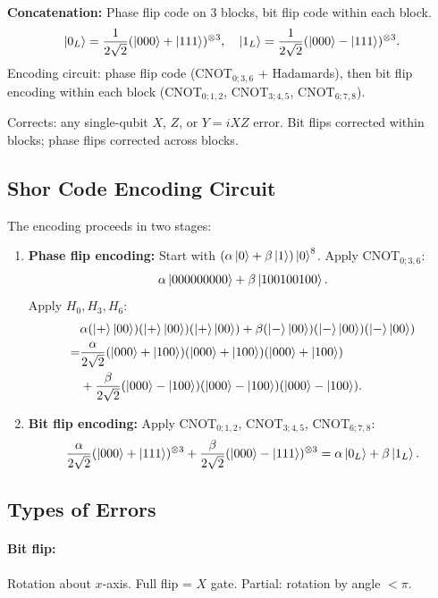 \documentclass[10pt,a4paper]{article}
\begin{document}
\begin{tcolorbox}[algostyle, title={Algorithm: Shor 9-Qubit Code}]
\textbf{Concatenation:} Phase flip code on 3 blocks, bit flip code within each block.
\[
\ket{0_L}=\frac{1}{2\sqrt{2}}(\ket{000}+\ket{111})^{\otimes 3},\quad \ket{1_L}=\frac{1}{2\sqrt{2}}(\ket{000}-\ket{111})^{\otimes 3}.
\]
Encoding circuit: phase flip code (CNOT$_{0;3,6}$ + Hadamards), then bit flip encoding within each block (CNOT$_{0;1,2}$, CNOT$_{3;4,5}$, CNOT$_{6;7,8}$).

Corrects: any single-qubit $X$, $Z$, or $Y=iXZ$ error. Bit flips corrected within blocks; phase flips corrected across blocks.
\end{tcolorbox}

\subsection{Shor Code Encoding Circuit}

The encoding proceeds in two stages:
\begin{enumerate}
\item \textbf{Phase flip encoding:} Start with $(\alpha\ket{0}+\beta\ket{1})\ket{0}^8$. Apply CNOT$_{0;3,6}$:
\[
\alpha\ket{000000000}+\beta\ket{100100100}.
\]
Apply $H_0, H_3, H_6$:
\begin{align*}
&\alpha(\ket{+}\ket{00})(\ket{+}\ket{00})(\ket{+}\ket{00})+\beta(\ket{-}\ket{00})(\ket{-}\ket{00})(\ket{-}\ket{00})\\
=&\frac{\alpha}{2\sqrt{2}}(\ket{000}+\ket{100})(\ket{000}+\ket{100})(\ket{000}+\ket{100})\\
&+\frac{\beta}{2\sqrt{2}}(\ket{000}-\ket{100})(\ket{000}-\ket{100})(\ket{000}-\ket{100}).
\end{align*}

\item \textbf{Bit flip encoding:} Apply CNOT$_{0;1,2}$, CNOT$_{3;4,5}$, CNOT$_{6;7,8}$:
\[
\frac{\alpha}{2\sqrt{2}}(\ket{000}+\ket{111})^{\otimes 3}+\frac{\beta}{2\sqrt{2}}(\ket{000}-\ket{111})^{\otimes 3}=\alpha\ket{0_L}+\beta\ket{1_L}.
\]
\end{enumerate}

\subsection{Types of Errors}

\paragraph{Bit flip:} Rotation about $x$-axis. Full flip = $X$ gate. Partial: rotation by angle $<\pi$.
\end{document}
